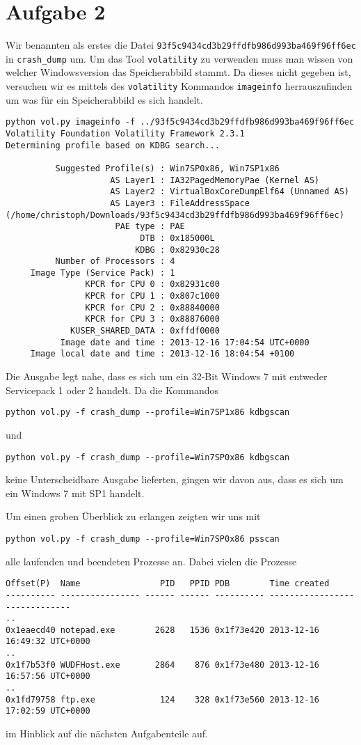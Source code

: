 \documentclass[10pt,a4paper]{article}
\begin{document}
\section*{Aufgabe 2}
Wir benannten als erstes die Datei \texttt{93f5c9434cd3b29ffdfb986d993ba469f96ff6ec} in \texttt{crash\_dump} um.
Um das Tool \texttt{volatility} zu verwenden muss man wissen von welcher Windowsversion das Speicherabbild stammt. Da dieses nicht gegeben ist, versuchen wir es mittels des \texttt{volatility} Kommandos \texttt{imageinfo} herrauszufinden um was für ein Speicherabbild es sich handelt.
\begin{verbatim}
python vol.py imageinfo -f ../93f5c9434cd3b29ffdfb986d993ba469f96ff6ec
Volatility Foundation Volatility Framework 2.3.1
Determining profile based on KDBG search...

          Suggested Profile(s) : Win7SP0x86, Win7SP1x86
                     AS Layer1 : IA32PagedMemoryPae (Kernel AS)
                     AS Layer2 : VirtualBoxCoreDumpElf64 (Unnamed AS)
                     AS Layer3 : FileAddressSpace (/home/christoph/Downloads/93f5c9434cd3b29ffdfb986d993ba469f96ff6ec)
                      PAE type : PAE
                           DTB : 0x185000L
                          KDBG : 0x82930c28
          Number of Processors : 4
     Image Type (Service Pack) : 1
                KPCR for CPU 0 : 0x82931c00
                KPCR for CPU 1 : 0x807c1000
                KPCR for CPU 2 : 0x88840000
                KPCR for CPU 3 : 0x88876000
             KUSER_SHARED_DATA : 0xffdf0000
           Image date and time : 2013-12-16 17:04:54 UTC+0000
     Image local date and time : 2013-12-16 18:04:54 +0100
\end{verbatim}
Die Ausgabe legt nahe, dass es sich um ein 32-Bit Windows 7 mit entweder Servicepack 1 oder 2 handelt. Da die Kommandos
\begin{verbatim}
python vol.py -f crash_dump --profile=Win7SP1x86 kdbgscan
\end{verbatim}
und 
\begin{verbatim}
python vol.py -f crash_dump --profile=Win7SP0x86 kdbgscan
\end{verbatim}
keine Unterscheidbare Ausgabe lieferten, gingen wir davon aus, dass es sich um ein Windows 7 mit SP1 handelt.

Um einen groben Überblick zu erlangen zeigten wir uns mit 
\begin{verbatim}
python vol.py -f crash_dump --profile=Win7SP0x86 psscan
\end{verbatim}
alle laufenden und beendeten Prozesse an. Dabei vielen die Prozesse
\begin{verbatim}
Offset(P)  Name                PID   PPID PDB        Time created                   
---------- ---------------- ------ ------ ---------- ------------------------------
..
0x1eaecd40 notepad.exe        2628   1536 0x1f73e420 2013-12-16 16:49:32 UTC+0000
..
0x1f7b53f0 WUDFHost.exe       2864    876 0x1f73e480 2013-12-16 16:57:56 UTC+0000
..
0x1fd79758 ftp.exe             124    328 0x1f73e560 2013-12-16 17:02:59 UTC+0000
\end{verbatim}
im Hinblick auf die nächsten Aufgabenteile auf. 
\end{document}
